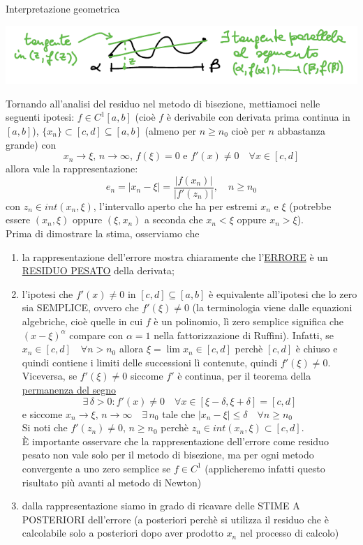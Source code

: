 \documentclass[12pt]{article}
\begin{document}
Interpretazione geometrica
\begin{center}
   \includegraphics{pag25} 
\end{center}
Tornando all'analisi del residuo nel metodo di bisezione, mettiamoci nelle seguenti ipotesi: $f\in C^1[a,b]$ (cioè $f$ è derivabile con derivata prima continua in $[a,b]$), $\{x_n\}\subset[c,d]\subseteq[a,b]$ (almeno per $n\ge n_0$ cioè per $n$ abbastanza grande) con \[x_n \to \xi,\,n \to \infty,\,f(\xi)=0 \text{ e } f'(x)\ne 0\quad \forall x\in [c,d]\] allora vale la rappresentazione:
\[e_n=|x_n-\xi|=\frac{|f(x_n)|}{|f'(z_n)|},\quad n\ge n_0\] con $z_n\in int(x_n,\xi)$, l'intervallo aperto che ha per estremi $x_n$ e $\xi$ (potrebbe essere $(x_n,\xi)$ oppure $(\xi,x_n)$ a seconda che $x_n<\xi$ oppure $x_n>\xi$).\\
Prima di dimostrare la stima, osserviamo che
\begin{enumerate}
    \item la rappresentazione dell'errore mostra chiaramente che l'\underline{ERRORE} è un \underline{RESIDUO PESATO} della derivata;
    \item l'ipotesi che $f'(x)\ne0$ in $[c,d]\subseteq [a,b]$ è equivalente all'ipotesi che lo zero sia SEMPLICE, ovvero che $f'(\xi)\ne 0$ (la terminologia viene dalle equazioni algebriche, cioè quelle in cui $f$ è un polinomio, lì zero semplice significa che $(x-\xi)^{\alpha}$ compare con $\alpha =1$ nella fattorizzazione di Ruffini). Infatti, se $x_n\in [c,d]\quad \forall n>n_0$ allora $\xi=\lim x_n\in [c,d]$ perchè $[c,d]$ è chiuso e quindi contiene i limiti delle successioni lì contenute, quindi $f'(\xi)\ne 0$.
    Viceversa, se $f'(\xi)\ne 0$ siccome $f'$ è continua, per il teorema della \underline{permanenza del segno}
    \[\exists\, \delta>0 : f'(x)\ne 0\quad \forall x \in [\xi - \delta, \xi + \delta] = [c,d]\]
    e siccome $x_n \to \xi,\,n \to \infty\quad \exists \,n_0$ tale che $|x_n-\xi|\le \delta \quad \forall n \ge n_0$\\
    Si noti che $f'(z_n)\ne 0,\, n\ge n_0$ perchè $z_n \in int(x_n,\xi)\subset[c,d]$.\\
    È importante osservare che la rappresentazione dell'errore come residuo pesato non vale solo per il metodo di bisezione, ma per ogni metodo convergente a uno zero semplice se $f\in C^1$ (applicheremo infatti questo risultato più avanti al metodo di Newton)
    \item dalla rappresentazione siamo in grado di ricavare delle STIME A POSTERIORI dell'errore (a posteriori perchè si utilizza il residuo che è calcolabile solo a posteriori dopo aver prodotto $x_n$ nel processo di calcolo)
\end{enumerate}
\end{document}
